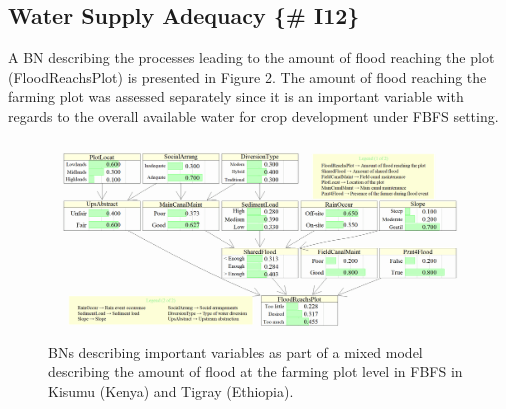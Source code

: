 \documentclass[12pt,oneside]{article}
\begin{document}
\hypertarget{water-supply-adequacy-i12}{%
\subsection{Water Supply Adequacy \{\# I12\}}\label{water-supply-adequacy-i12}}

A BN describing the processes leading to the amount of flood reaching the plot (FloodReachsPlot) is presented in Figure 2. The amount of flood reaching the farming plot was assessed separately since it is an important variable with regards to the overall available water for crop development under FBFS setting.

\begin{figure}[!htbp]

{\centering \includegraphics[width=1\linewidth,]{figures/Modelling_FBFS_Suppl_flood_reaching_plot_BNs_plot} 

}

\caption{BNs describing important variables as part of a mixed model describing the amount of flood at the farming plot level in FBFS in Kisumu (Kenya) and Tigray (Ethiopia).}\label{fig:fig2}
\end{figure}
\end{document}

